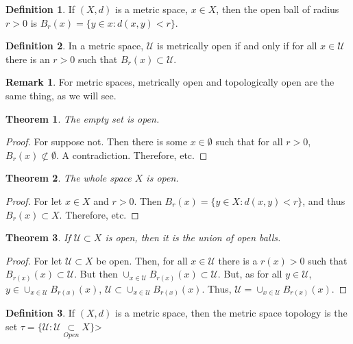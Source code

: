 \documentclass[oneside]{book}
\newtheorem{theorem}{Theorem}[section]
\theoremstyle{definition}
\newtheorem{definition}{Definition}[section]
\newtheorem{remark}{Remark}[section]
\begin{document}
\begin{definition}
If $(X,d)$ is a metric space, $x\in X$, then the open ball of radius $r>0$ is $B_{r}(x) = \{y\in x: d(x,y)<r\}$.
\end{definition}

\begin{definition}
In a metric space, $\mathcal{U}$ is metrically open if and only if for all $x\in \mathcal{U}$ there is an $r>0$ such that $B_{r}(x)\subset \mathcal{U}$.
\end{definition}

\begin{remark}
For metric spaces, metrically open and topologically open are the same thing, as we will see.
\end{remark} 

\begin{theorem}
The empty set is open.
\end{theorem}
\begin{proof}
For suppose not. Then there is some $x\in \emptyset$ such that for all $r>0$, $B_{r}(x)\not\subset \emptyset$. A contradiction. Therefore, etc.
\end{proof}

\begin{theorem}
The whole space $X$ is open.
\end{theorem}
\begin{proof}
For let $x\in X$ and $r>0$. Then $B_{r}(x) = \{y\in X:d(x,y)<r\}$, and thus $B_{r}(x)\subset X$. Therefore, etc.
\end{proof}

\begin{theorem}
If $\mathcal{U}\subset X$ is open, then it is the union of open balls.
\end{theorem}
\begin{proof}
For let $\mathcal{U} \subset X$ be open. Then, for all $x\in \mathcal{U}$ there is a $r(x)>0$ such that $B_{r(x)}(x) \subset \mathcal{U}$. But then $\cup_{x\in \mathcal{U}}B_{r(x)}(x)\subset \mathcal{U}$. But, as for all $y\in \mathcal{U}$, $y\in \cup_{x\in \mathcal{U}}B_{r(x)}(x)$, $\mathcal{U} \subset \cup_{x\in \mathcal{U}}B_{r(x)}(x)$. Thus, $\mathcal{U}= \cup_{x\in \mathcal{U}}B_{r(x)}(x)$.
\end{proof}

\begin{definition}
If $(X,d)$ is a metric space, then the metric space topology is the set $\tau = \{\mathcal{U}:\mathcal{U}\underset{Open}\subset X\}$>
\end{definition}
\end{document}
